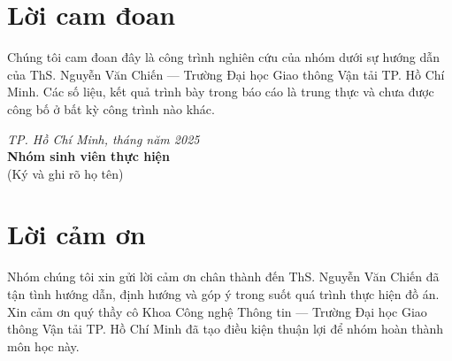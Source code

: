 \documentclass[14pt, a4paper]{extreport}
\begin{document}


\setcounter{page}{1}

\chapter*{Lời cam đoan}
\noindent
Chúng tôi cam đoan đây là công trình nghiên cứu của nhóm dưới sự
hướng dẫn của ThS. Nguyễn Văn Chiến --- Trường Đại học Giao thông
Vận tải TP. Hồ Chí Minh. Các số liệu, kết quả trình bày trong báo
cáo là trung thực và chưa được công bố ở bất kỳ công trình nào khác.

\vspace{2.5cm}
\begin{flushright}
  \textit{TP. Hồ Chí Minh, tháng \hspace{1cm} năm 2025}\\[1cm]
  \textbf{Nhóm sinh viên thực hiện}\\[0.3cm]
  (Ký và ghi rõ họ tên)
\end{flushright}
\newpage

\chapter*{Lời cảm ơn}
\noindent
Nhóm chúng tôi xin gửi lời cảm ơn chân thành đến ThS. Nguyễn Văn
Chiến đã tận tình hướng dẫn, định hướng và góp ý trong suốt quá
trình thực hiện đồ án. Xin cảm ơn quý thầy cô Khoa Công nghệ
Thông tin --- Trường Đại học Giao thông Vận tải TP. Hồ Chí Minh
đã tạo điều kiện thuận lợi để nhóm hoàn thành môn học này.
\newpage

\tableofcontents
\newpage

\listoffigures
{}
\newpage

\listoftables
{}
\newpage

\end{document}

